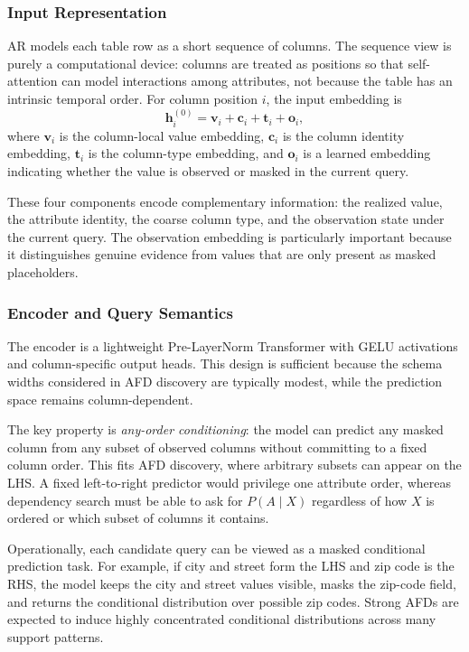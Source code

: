 \documentclass[conference]{IEEEtran}
\begin{document}
\subsubsection{Input Representation}

AR models each table row as a short sequence of columns. The sequence view is purely a computational device: columns are treated as positions so that self-attention can model interactions among attributes, not because the table has an intrinsic temporal order. For column position $i$, the input embedding is
\begin{equation}
    \mathbf{h}_i^{(0)} = \mathbf{v}_i + \mathbf{c}_i + \mathbf{t}_i + \mathbf{o}_i,
\end{equation}
where $\mathbf{v}_i$ is the column-local value embedding, $\mathbf{c}_i$ is the column identity embedding, $\mathbf{t}_i$ is the column-type embedding, and $\mathbf{o}_i$ is a learned embedding indicating whether the value is observed or masked in the current query.

These four components encode complementary information: the realized value, the attribute identity, the coarse column type, and the observation state under the current query. The observation embedding is particularly important because it distinguishes genuine evidence from values that are only present as masked placeholders.

\subsubsection{Encoder and Query Semantics}

The encoder is a lightweight Pre-LayerNorm Transformer with GELU activations and column-specific output heads. This design is sufficient because the schema widths considered in AFD discovery are typically modest, while the prediction space remains column-dependent.

The key property is \emph{any-order conditioning}: the model can predict any masked column from any subset of observed columns without committing to a fixed column order. This fits AFD discovery, where arbitrary subsets can appear on the LHS. A fixed left-to-right predictor would privilege one attribute order, whereas dependency search must be able to ask for $P(A \mid X)$ regardless of how $X$ is ordered or which subset of columns it contains.

Operationally, each candidate query can be viewed as a masked conditional prediction task. For example, if city and street form the LHS and zip code is the RHS, the model keeps the city and street values visible, masks the zip-code field, and returns the conditional distribution over possible zip codes. Strong AFDs are expected to induce highly concentrated conditional distributions across many support patterns.
\end{document}
